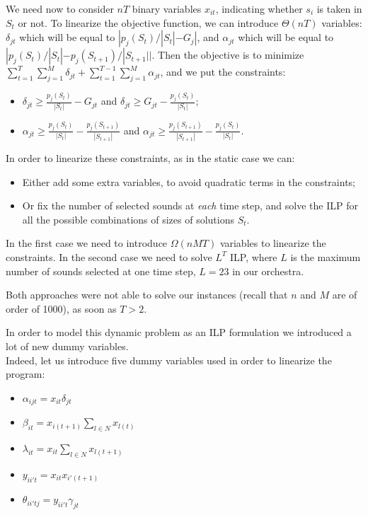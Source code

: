 \documentclass[a4paper]{book}
\begin{document}
We need now to consider $nT$ binary variables $x_{it}$, indicating whether $s_i$ is taken in $S_t$ or not. To linearize the objective function, we can introduce $\Theta(nT)$ variables: $\delta_{jt}$ which will be equal to $|p_j(S_t)/|S_t|-G_j|$, and $\alpha_{jt}$ which will be equal to $|p_j(S_t)/|S_t|-p_j(S_{t+1})/|S_{t+1}||$. Then the objective is to minimize $\sum_{t=1}^T\sum_{j=1}^M \delta_{jt}+ \sum_{t=1}^{T-1}\sum_{j=1}^M \alpha_{jt}$, and we put the constraints:
\begin{itemize}
    \item $\delta_{jt}\geq \frac{p_j(S_t)}{|S_t|}-G_{jt}$ and $\delta_{jt}\geq G_{jt}-\frac{p_j(S_t)}{|S_t|}$;
    \item $\alpha_{jt}\geq \frac{p_j(S_t)}{|S_t|}-\frac{p_j(S_{t+1})}{|S_{t+1}|}$ and $\alpha_{jt}\geq \frac{p_j(S_{t+1})}{|S_{t+1}|}-\frac{p_j(S_t)}{|S_t|}$.
\end{itemize}

In order to linearize these constraints, as in the static case we can:
\begin{itemize}
    \item Either add some extra variables, to avoid quadratic terms in the constraints;
    \item Or fix the number of selected sounds at {\it each} time step, and solve the ILP for all the possible combinations of sizes of solutions $S_t$.
\end{itemize}
In the first case we need to introduce $\Omega(nMT)$ variables to linearize the constraints. In the second case we need to solve $L^T$ ILP, where $L$ is the maximum number of sounds selected at one time step, $L=23$ in our orchestra.

Both approaches were not able to solve our instances (recall that $n$ and $M$ are of order of 1000), as soon as $T>2$. 

In order to model this dynamic problem as an ILP formulation we introduced a lot of new dummy variables.\\
Indeed, let us introduce five dummy variables used in order to linearize the program:

\begin{itemize}
    \item $ \alpha_{ijt}= x_{it}\delta_{jt}$ 
    \item $\beta_{it} = x_{i(t+1)}\sum\limits_{l\in N} x_{l(t)}$
    \item $\lambda_{it} = x_{it}\sum\limits_{l\in N} x_{l(t+1)}$
    \item $y_{ii't}= x_{it}x_{i'(t+1)}$ 
    \item $\theta_{ii'tj}= y_{ii't} \gamma_{jt}$
\end{itemize}
\end{document}
